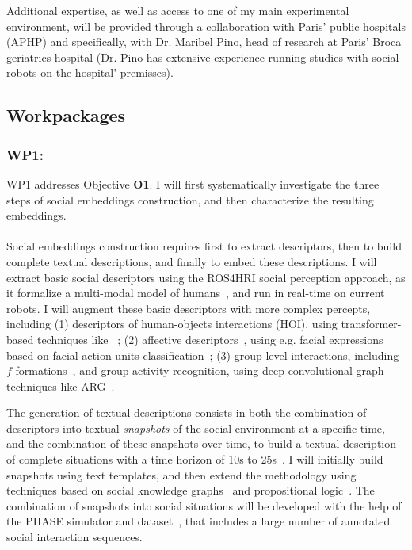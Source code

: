 Additional expertise, as well as access to one of my main experimental
environment, will be provided through a collaboration with Paris' public
hospitals (APHP) and specifically, with Dr. Maribel Pino, head of research at
Paris' Broca geriatrics hospital (Dr. Pino has extensive experience running
studies with social robots on the hospital' premisses).


\subsection{Workpackages}

\subsubsection{WP1: \textbf{\WPA}}

WP1 addresses Objective \textbf{O1}. I will first systematically investigate the
three steps of social embeddings construction, and then characterize the
resulting embeddings.


\paragraph{\TAA}

Social embeddings construction requires first to extract descriptors, then to
build complete textual descriptions, and finally to embed these descriptions.  I
will extract basic social descriptors using the ROS4HRI social perception
approach, as it formalize a multi-modal model of humans~\cite{lemaignan2022ros},
and run in real-time on current robots. I will augment these basic descriptors
with more complex percepts, including (1) descriptors of human-objects
interactions (HOI), using transformer-based techniques
like~\cite{iftekhar2022what} ; (2) affective
descriptors~\cite{vinciarelli2009social}, using e.g. facial expressions based on
facial action units classification~\cite{martinez2019automatic}; (3) group-level
interactions, including $f$-formations~\cite{setti2015fformation}, and group
activity recognition, using deep convolutional graph techniques like
ARG~\cite{wu2019learning}.


The generation of textual descriptions consists in both the combination of
descriptors into textual \emph{snapshots} of the social environment at a
specific time, and the combination of these snapshots over time, to build a
textual description of complete situations with a time horizon of 10s to
25s~\cite{netanyahu2021phase}. I will initially build snapshots using text
templates, and then extend the methodology using techniques based on
social knowledge graphs~\cite{sap2019atomic} and propositional
logic~\cite{tsoi2022sean}. The combination of snapshots into social situations
will be developed with the help of the PHASE simulator and
dataset~\cite{netanyahu2021phase}, that includes a large number of annotated
social interaction sequences.

